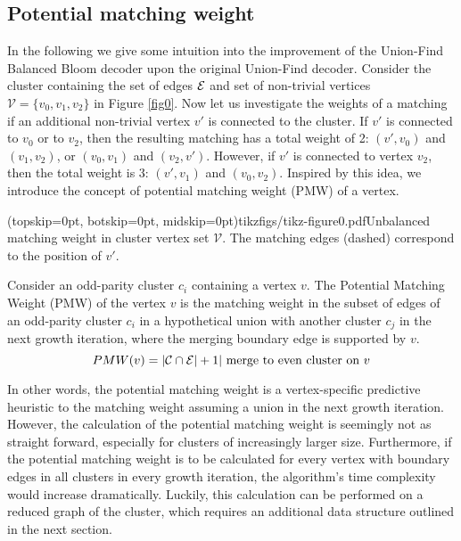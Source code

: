 \subsection{Potential matching weight}\label{sec:matchingweight}

In the following we give some intuition into the improvement of the Union-Find Balanced Bloom decoder upon the original Union-Find decoder. Consider the cluster containing the set of edges $\mathcal{E}$ and set of non-trivial vertices $\mathcal{V}=\{v_0,v_1,v_2\}$ in Figure \ref{fig0}. Now let us investigate the weights of a matching if an additional non-trivial vertex $v'$ is connected to the cluster. If $v'$ is connected to $v_0$ or to $v_2$, then the resulting matching has a total weight of 2: $(v',v_0)$ and $(v_1,v_2)$, or $(v_0,v_1)$ and $(v_2,v')$. However, if $v'$ is connected to vertex $v_2$, then the total weight is 3: $(v', v_1)$ and $(v_0, v_2)$. Inspired by this idea, we introduce the concept of potential matching weight (PMW) of a vertex. 

\Figure[htb](topskip=0pt, botskip=0pt, midskip=0pt){tikzfigs/tikz-figure0.pdf}{Unbalanced matching weight in cluster vertex set $\mathcal{V}$. The matching edges (dashed) correspond to the position of $v'$.\label{fig0}}

\begin{definition}\label{def:pmw}
    Consider an odd-parity cluster $c_i$ containing a vertex $v$. The Potential Matching Weight (PMW) of the vertex $v$ is the matching weight in the subset of edges of an odd-parity cluster $c_i$ in a hypothetical union with another cluster $c_j$ in the next growth iteration, where the merging boundary edge is supported by $v$. 
    \begin{equation}
      PMW(v) = \lvert\mathcal{C} \cap \mathcal{E}\rvert + 1 |\text{ merge to even cluster on } v
    \end{equation}
\end{definition}
In other words, the potential matching weight is a vertex-specific predictive heuristic to the matching weight assuming a union in the next growth iteration. However, the calculation of the potential matching weight is seemingly not as straight forward, especially for clusters of increasingly larger size. Furthermore, if the potential matching weight is to be calculated for every vertex with boundary edges in all clusters in every growth iteration, the algorithm's time complexity would increase dramatically. Luckily, this calculation can be performed on a reduced graph of the cluster, which requires an additional data structure outlined in the next section. 

